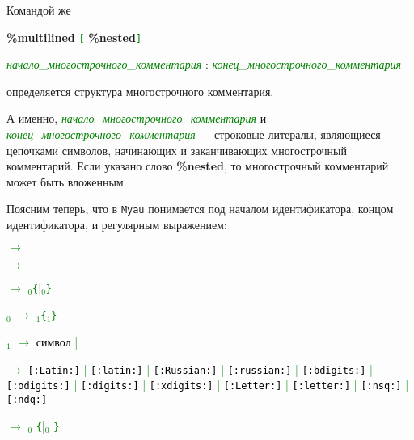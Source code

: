 \documentclass[10pt]{report}
\begin{document}
Командой же

{\noindent%
\textbf{\%multilined} \texttt{\textcolor{Green}{[}}%
\textbf{\%nested}\texttt{\textcolor{Green}{]}}

\textcolor{Green}{\textit{начало_многострочного_комментария}} :
\textcolor{Green}{\textit{конец_многострочного_комментария}}
}

\noindent%
определяется структура многострочного комментария. 

А именно, \textcolor{Green}{\textit{начало_многострочного_комментария}} и \textcolor{Green}{\textit{конец_многострочного_комментария}} --- строковые литералы, являющиеся
цепочками символов, начинающих и заканчивающих многострочный комментарий. Если указано слово \textbf{\%nested}, то многострочный комментарий может быть вложенным.

Поясним теперь, что в \texttt{Myau} понимается под началом идентификатора, концом идентификатора, и регулярным выражением:

\textcolor{Green}{ $\to$ }\textcolor{Green}{}

\textcolor{Green}{ $\to$ }\textcolor{Green}{}

\textcolor{Green}{ $\to$ $_0$\texttt{\{}\textcolor{Black}{|}$_0$\texttt{\}}}

\textcolor{Green}{$_0$ $\to$ $_1$\texttt{\{}$_1$\texttt{\}}}


\textcolor{Green}{$_1$ $\to$ \textcolor{Black}{символ} | }

\textcolor{Green}{ $\to$ \texttt{\textcolor{Black}{[:Latin:]}} | \texttt{\textcolor{Black}{[:latin:]}} | \texttt{\textcolor{Black}{[:Russian:]}} |
\texttt{\textcolor{Black}{[:russian:]}} | \texttt{\textcolor{Black}{[:bdigits:]}} |\\
{}\texttt{\textcolor{Black}{[:odigits:]}} | \texttt{\textcolor{Black}{[:digits:]}} | \texttt{\textcolor{Black}{[:xdigits:]}} | \texttt{\textcolor{Black}{[:Letter:]}} |
\texttt{\textcolor{Black}{[:letter:]}} | \texttt{\textcolor{Black}{[:nsq:]}} | \texttt{\textcolor{Black}{[:ndq:]}} }

\textcolor{Green}{ $\to$ $_0$ \texttt{\{}\textcolor{Black}{|}$_0$ \texttt{\}}
}
\end{document}
